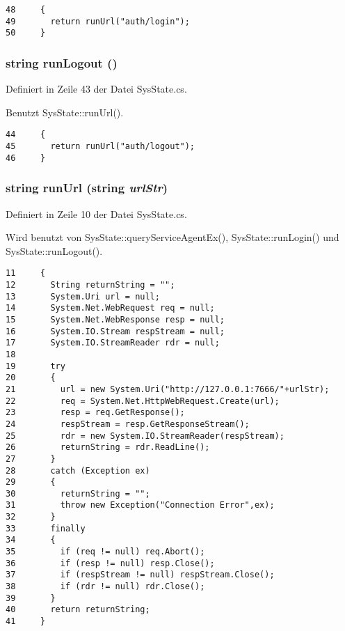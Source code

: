 \footnotesize\begin{verbatim}48     {
49       return runUrl("auth/login");
50     }
\end{verbatim}\normalsize 
\hypertarget{classQbeSAS_1_1SysState_QbeSAS_1_1SysStatee1}{
\subsubsection[runLogout]{\setlength{\rightskip}{0pt plus 5cm}string run\-Logout ()}}
\label{classQbeSAS_1_1SysState_QbeSAS_1_1SysStatee1}




Definiert in Zeile 43 der Datei Sys\-State.cs.

Benutzt Sys\-State::run\-Url().



\footnotesize\begin{verbatim}44     {
45       return runUrl("auth/logout");
46     }
\end{verbatim}\normalsize 
\hypertarget{classQbeSAS_1_1SysState_QbeSAS_1_1SysStatee0}{
\subsubsection[runUrl]{\setlength{\rightskip}{0pt plus 5cm}string run\-Url (string {\em url\-Str})}}
\label{classQbeSAS_1_1SysState_QbeSAS_1_1SysStatee0}




Definiert in Zeile 10 der Datei Sys\-State.cs.

Wird benutzt von Sys\-State::query\-Service\-Agent\-Ex(), Sys\-State::run\-Login() und Sys\-State::run\-Logout().



\footnotesize\begin{verbatim}11     {
12       String returnString = "";
13       System.Uri url = null;
14       System.Net.WebRequest req = null;
15       System.Net.WebResponse resp = null;
16       System.IO.Stream respStream = null;
17       System.IO.StreamReader rdr = null;
18 
19       try 
20       {
21         url = new System.Uri("http://127.0.0.1:7666/"+urlStr);
22         req = System.Net.HttpWebRequest.Create(url);
23         resp = req.GetResponse();
24         respStream = resp.GetResponseStream();
25         rdr = new System.IO.StreamReader(respStream);
26         returnString = rdr.ReadLine();
27       } 
28       catch (Exception ex)
29       {
30         returnString = "";
31         throw new Exception("Connection Error",ex);
32       } 
33       finally 
34       {
35         if (req != null) req.Abort();
36         if (resp != null) resp.Close();
37         if (respStream != null) respStream.Close();
38         if (rdr != null) rdr.Close();
39       }
40       return returnString;
41     }
\end{verbatim}\normalsize 
